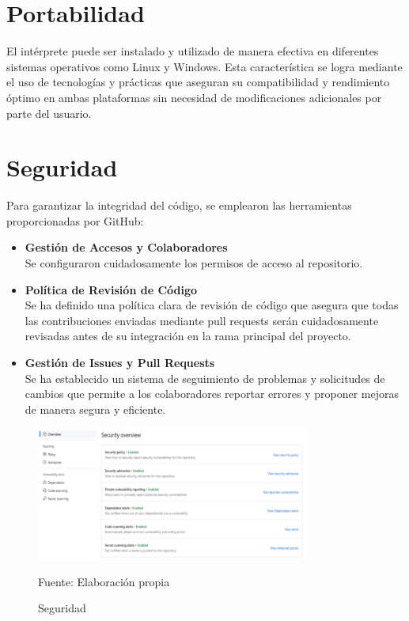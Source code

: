 \section{Portabilidad}
El intérprete puede ser instalado y utilizado de manera efectiva en diferentes sistemas operativos como Linux y Windows. Esta característica se logra mediante el uso de tecnologías y prácticas que aseguran su compatibilidad y rendimiento óptimo en ambas plataformas sin necesidad de modificaciones adicionales por parte del usuario.

\section{Seguridad}
Para garantizar la integridad del código, se emplearon las herramientas proporcionadas por GitHub:
\begin{itemize}
  \item \textbf{Gestión de Accesos y Colaboradores} \\
  Se configuraron cuidadosamente los permisos de acceso al repositorio.
  \item \textbf{Política de Revisión de Código} \\
  Se ha definido una política clara de revisión de código que asegura que todas las contribuciones enviadas mediante pull requests serán cuidadosamente revisadas antes de su integración en la rama principal del proyecto.
  \item \textbf{Gestión de Issues y Pull Requests} \\
  Se ha establecido un sistema de seguimiento de problemas y solicitudes de cambios que permite a los colaboradores reportar errores y proponer mejoras de manera segura y eficiente.
\end{itemize}

\begin{figure}[!h]
  \centering
  \includegraphics[width=0.8\textwidth]{images/seguridad.png}
  \caption{Seguridad}
  \centering Fuente: Elaboración propia
  \label{fig:seguridad}
\end{figure}


